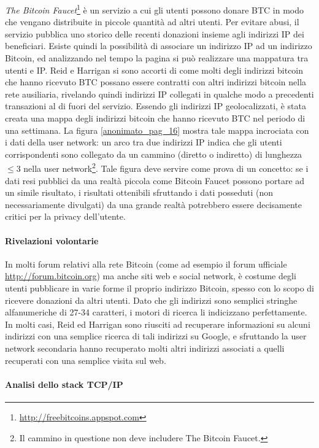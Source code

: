\emph{The Bitcoin Faucet}\footnote{\url{http://freebitcoins.appspot.com}} è un servizio a cui gli utenti possono donare BTC in modo che vengano distribuite in piccole quantità ad altri utenti. Per evitare abusi, il servizio pubblica uno storico delle recenti donazioni insieme agli indirizzi IP dei beneficiari. Esiste quindi la possibilità di associare un indirizzo IP ad un indirizzo Bitcoin, ed analizzando nel tempo la pagina si può realizzare una mappatura tra utenti e IP.
Reid e Harrigan si sono accorti di come molti degli indirizzi bitcoin che hanno ricevuto BTC possano essere contratti con altri indirizzi bitcoin nella rete ausiliaria, rivelando quindi indirizzi IP collegati in qualche modo a precedenti transazioni al di fuori del servizio.
Essendo gli indirizzi IP geolocalizzati, è stata creata una mappa degli indirizzi bitcoin che hanno ricevuto BTC nel periodo di una settimana. La figura \ref{anonimato_pag_16} mostra tale mappa incrociata con i dati della user network: un arco tra due indirizzi IP indica che gli utenti corrispondenti sono collegato da un cammino (diretto o indiretto) di lunghezza $\leq 3$ nella user network\footnote{Il cammino in questione non deve includere The Bitcoin Faucet.}. Tale figura deve servire come prova di un concetto: se i dati resi pubblici da una realtà piccola come Bitcoin Faucet possono portare ad un simile risultato, i risultati ottenibili sfruttando i dati posseduti (non necessariamente divulgati) da una grande realtà potrebbero essere decisamente critici per la privacy dell'utente.

\paragraph{Rivelazioni volontarie}

In molti forum relativi alla rete Bitcoin (come ad esempio il forum ufficiale \url{http://forum.bitcoin.org}) ma anche siti web e social network, è costume degli utenti pubblicare in varie forme il proprio indirizzo Bitcoin, spesso con lo scopo di ricevere donazioni da altri utenti. Dato che gli indirizzi sono semplici stringhe alfanumeriche di 27-34 caratteri, i motori di ricerca li indicizzano perfettamente.
In molti casi, Reid ed Harrigan sono riusciti ad recuperare informazioni su alcuni indirizzi con una semplice ricerca di tali indirizzi su Google, e sfruttando la user network secondaria hanno recuperato molti altri indirizzi associati a quelli recuperati con una semplice visita sul web.

\paragraph{Analisi dello stack TCP/IP}

